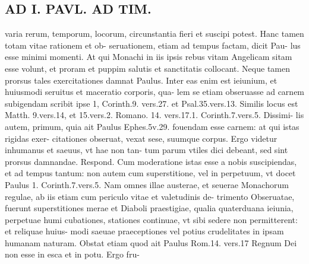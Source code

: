 \documentclass{article}
\begin{document}
\begin{pages}
\section*{AD I. PAVL. AD TIM. }
\marginpar{[ p.210 ]}\pstart varia rerum, temporum, locorum, circunstantia fieri et suscipi potest. Hanc tamen totam vitae rationem et ob- seruationem, etiam ad tempus factam, dicit Pau- lus esse minimi momenti. At qui Monachi in iis ipsis rebus vitam Angelicam sitam esse volunt, et proram et puppim salutis et sanctitatis collocant. Neque tamen prorsus tales exercitationes damnat Paulus. Inter eas enim est ieiunium, et huiusmodi seruitus et maceratio corporis, qua- lem se etiam obseruasse ad carnem subigendam scribit ipse 1, Corinth.9. vers.27. et Psal.35.vers.13. Similis locus est Matth. 9.vers.14, et 15.vers.2. Romano. 14. vers.17.1. Corinth.7.vers.5. Dissimi- lis autem, primum, quia ait Paulus Ephes.5v.29. fouendam esse carnem: at qui istas rigidas exer- citationes obseruat, vexat sese, suumque corpus. Ergo videtur inhumanus et saeuus, vt hae non tan- tum parum vtiles dici debeant, sed sint prorsus damnandae. Respond. Cum moderatione istas esse a nobis suscipiendas, et ad tempus tantum: non autem cum superstitione, vel in perpetuum, vt docet Paulus 1. Corinth.7.vers.5. Nam omnes illae austerae, et seuerae Monachorum regulae, ab iis etiam cum periculo vitae et valetudinis de- trimento Obseruatae, fuerunt superstitiones merae et Diaboli praestigiae, qualia quaterduana ieiunia, perpetuae humi cubationes, stationes continuae, vt sibi sedere non permitterent: et reliquae huius- modi saeuae praeceptiones vel potius crudelitates in ipsam humanam naturam. Obstat etiam quod ait Paulus Rom.14. vers.17 Regnum Dei non esse in esca et in potu. Ergo fru-  \pend

\end{pages}
\end{document}
